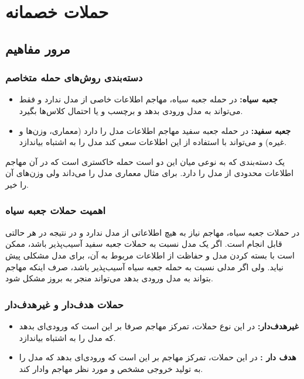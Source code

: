 
\def \Subject {حملات خصمانه}
\def \Session { دو}
\renewcommand{\chaptername}{سوال}
\chapter{\Subject}

\section{ مرور مفاهیم}

\subsection{دسته‌بندی روش‌های حمله متخاصم}
\begin{itemize}
	\item 
\textbf{جعبه سیاه:}
در حمله جعبه سیاه، مهاجم اطلاعات خاصی از مدل ندارد و فقط می‌تواند به مدل ورودی بدهد و برچسب و یا احتمال کلاس‌ها بگیرد. 
\item 
\textbf{جعبه سفید:}
در حمله جعبه سفید مهاجم اطلاعات مدل را دارد (معماری، وزن‌ها و غیره) و می‌تواند با استفاده از این اطلاعات سعی کند مدل را به اشتباه بیاندازد. 
\end{itemize}

یک دسته‌بندی که به نوعی میان این دو است حمله خاکستری است که در آن مهاجم اطلاعات محدودی از مدل را دارد. برای مثال معماری مدل را می‌داند ولی وزن‌های آن را خیر.

\subsection{اهمیت حملات جعبه سیاه}
در حملات جعبه سیاه، مهاجم نیاز به هیچ اطلاعاتی از مدل ندارد و در نتیجه در هر حالتی قابل انجام است. اگر یک مدل نسبت به حملات جعبه سفید آسیب‌پذیر باشد، ممکن است با بسته کردن مدل و حفاظت از اطلاعات مربوط به آن، برای مدل مشکلی پیش نیاید. ولی اگر مدلی نسبت به حمله جعبه سیاه آسیب‌پذیر باشد، صرف اینکه مهاجم بتواند به مدل ورودی بدهد می‌تواند منجر به بروز مشکل شود.
\subsection{حملات هدف‌دار و غیرهدف‌دار}
\begin{itemize}
	\item 
	\textbf{ غیرهدف‌دار:}
در این نوع حملات، تمرکز مهاجم صرفا بر این است که ورودی‌ای بدهد که مدل را به اشتباه بیاندازد.
	\item 
	\textbf{هدف دار :}
در این حملات، تمرکز مهاجم بر این است که ورودی‌ای بدهد که  مدل را به تولید خروجی مشخص و مورد نظر مهاجم وادار کند.
\end{itemize}
